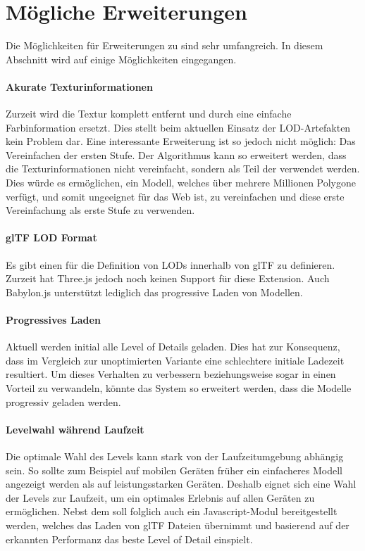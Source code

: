 \section{Mögliche Erweiterungen}
Die Möglichkeiten für Erweiterungen zu  sind sehr umfangreich. In diesem Abschnitt wird auf einige Möglichkeiten eingegangen.

\paragraph{Akurate Texturinformationen}
Zurzeit wird die Textur komplett entfernt und durch eine einfache Farbinformation ersetzt. Dies stellt beim aktuellen Einsatz der LOD-Artefakten kein Problem dar. Eine interessante Erweiterung ist so jedoch nicht möglich: Das Vereinfachen der ersten Stufe. Der Algorithmus kann so erweitert werden, dass die Texturinformationen nicht vereinfacht, sondern als Teil der  verwendet werden. Dies würde es ermöglichen, ein Modell, welches über mehrere Millionen Polygone verfügt, und somit ungeeignet für das Web ist, zu vereinfachen und diese erste Vereinfachung als erste Stufe zu verwenden.

\paragraph{glTF LOD Format}
Es gibt einen  für die Definition von LODs innerhalb von glTF zu definieren. \cite{glTFExtensionLOD}
Zurzeit hat Three.js jedoch noch keinen Support für diese Extension. Auch Babylon.js unterstützt lediglich das progressive Laden von Modellen. \cite{babylonProgressiveLoading}

\paragraph{Progressives Laden}
Aktuell werden initial alle Level of Details geladen. Dies hat zur Konsequenz, dass im Vergleich zur unoptimierten Variante eine schlechtere initiale Ladezeit resultiert. Um dieses Verhalten zu verbessern beziehungsweise sogar in einen Vorteil zu verwandeln, könnte das System so erweitert werden, dass die Modelle progressiv geladen werden.

\paragraph{Levelwahl während Laufzeit}
Die optimale Wahl des Levels kann stark von der Laufzeitumgebung abhängig sein. So sollte zum Beispiel auf mobilen Geräten früher ein einfacheres Modell angezeigt werden als auf leistungsstarken Geräten.
Deshalb eignet sich eine Wahl der Levels zur Laufzeit, um ein optimales Erlebnis auf allen Geräten zu ermöglichen.
Nebst dem  soll folglich auch ein Javascript-Modul bereitgestellt werden, welches das Laden von glTF Dateien übernimmt und basierend auf der erkannten Performanz das beste Level of Detail einspielt.

